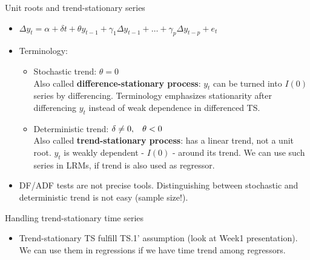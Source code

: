 \documentclass[usenames,dvipsnames]{beamer}
\begin{document}
\begin{frame}{Unit roots and trend-stationary series}
\begin{itemize}
\item $ \Delta y_t = \alpha + \delta t + \theta y_{t-1} + \gamma_1\Delta y_{t-1}+\dots+\gamma_p\Delta y_{t-p}+e_t$
\vspace{0.2cm}
\item Terminology:
\vspace{0.2cm}
\begin{itemize}
\item Stochastic trend: $\theta=0$ \\
Also called \textbf{difference-stationary process}: $y_t$ can be turned into $I(0)$ series by differencing. Terminology emphasizes stationarity after differencing $y_t$ instead of weak dependence in differenced TS.
\vspace{0.2cm}
\item Deterministic trend: $\delta \neq 0, \hspace{0.3cm} \theta<0$ \\
Also called \textbf{trend-stationary process}: has a linear trend, not a unit root. $y_t$ is weakly dependent - $I(0)$ - around its trend. We can use such series in LRMs, if trend is also used as regressor.

\end{itemize}
\vspace{0.3cm}
\item DF/ADF tests are not precise tools. Distinguishing between stochastic and deterministic trend is not easy (sample size!). 
\end{itemize}
\end{frame}


\begin{frame}{Handling trend-stationary time series}
\begin{itemize}
\item Trend-stationary TS fulfill TS.1' assumption (look at Week1 presentation). \\ 
\vspace{0.5cm}
We can use them in regressions if we have time trend among regressors.
\end{itemize}
\end{frame}

\end{document}
